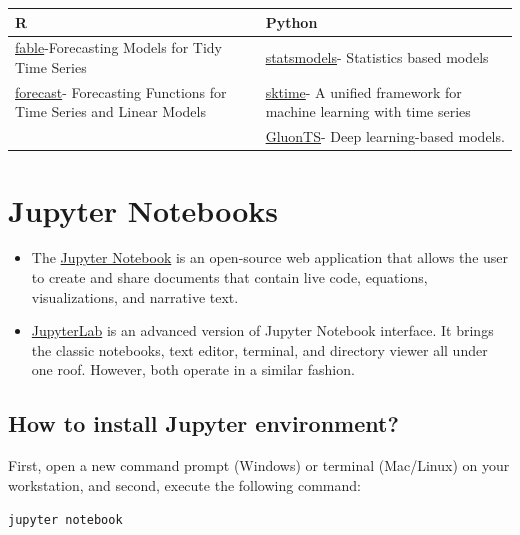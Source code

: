 \documentclass[
]{book}
\providecommand{\tightlist}{%
  \setlength{\itemsep}{0pt}\setlength{\parskip}{0pt}}
\begin{document}
\begin{longtable}[]{@{}
  >{\raggedright\arraybackslash}p{}
  >{\raggedright\arraybackslash}p{}@{}}
\toprule
R & Python \\
\midrule
\endhead
\href{https://cran.r-project.org/web/packages/fable/index.html}{fable}-Forecasting Models for Tidy Time Series & \href{https://www.statsmodels.org/devel/user-guide.html\#time-series-analysis}{statsmodels}- Statistics based models \\
\href{https://cran.r-project.org/web/packages/forecast/index.html}{forecast}- Forecasting Functions for Time Series and Linear Models & \href{https://www.sktime.org/en/latest/}{sktime}- A unified framework for machine learning with time series \\
\(\text{}\) & \href{https://ts.gluon.ai/}{GluonTS}- Deep learning-based models. \\
\bottomrule
\end{longtable}

\hypertarget{jupyter-notebooks}{%
\chapter{Jupyter Notebooks}\label{jupyter-notebooks}}

\begin{itemize}
\tightlist
\item
  The \href{https://jupyter.org/}{Jupyter Notebook} is an open-source web application that allows the user to create and share documents that contain live code, equations, visualizations, and narrative text.
\item
  \href{https://jupyter.org/}{JupyterLab} is an advanced version of Jupyter Notebook interface. It brings the classic notebooks, text editor, terminal, and directory viewer all under one roof. However, both operate in a similar fashion.
\end{itemize}

\hypertarget{how-to-install-jupyter-environment}{%
\section{How to install Jupyter environment?}\label{how-to-install-jupyter-environment}}

First, open a new command prompt (Windows) or terminal (Mac/Linux) on your workstation, and second, execute the following command:

\texttt{jupyter\ notebook}
\end{document}
